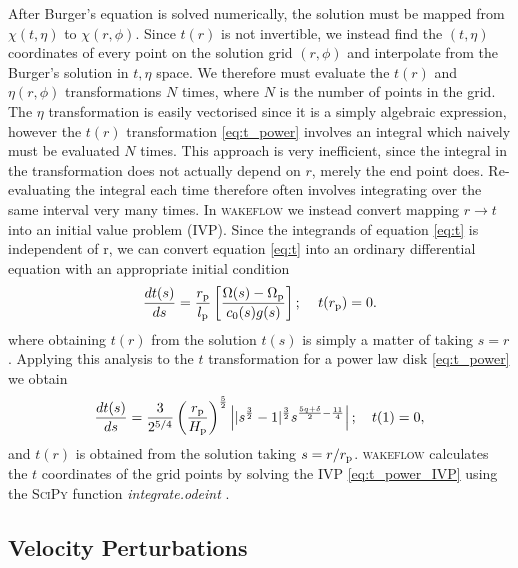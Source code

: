 After Burger's equation is solved numerically, the solution must be mapped from $\chi(t,\eta)$ to $\chi(r,\phi)$.
Since $t(r)$ is not invertible, we instead find the $(t,\eta)$ coordinates of every point on the solution grid $(r,\phi)$ and interpolate from the Burger's solution in $t,\eta$ space.
We therefore must evaluate the $t(r)$ and $\eta(r,\phi)$ transformations $N$ times, where $N$ is the number of points in the grid.
The $\eta$ transformation is easily vectorised since it is a simply algebraic expression, however the $t(r)$ transformation \ref{eq:t_power} involves an integral which naively must be evaluated $N$ times.
This approach is very inefficient, since the integral in the transformation does not actually depend on $r$, merely the end point does.
Re-evaluating the integral each time therefore often involves integrating over the same interval very many times.
In \textsc{wakeflow} we instead convert mapping $r\rightarrow t$ into an initial value problem (IVP).
Since the integrands of equation \ref{eq:t} is independent of r, we can convert equation \ref{eq:t} into an ordinary differential equation with an appropriate initial condition
\begin{align}
    \frac{dt(s)}{ds} = \frac{r_{\rm p}}{l_{\rm p}} \left[ \frac{\Omega(s) - \Omega_{\rm p}}{c_0(s) g(s)} \right]; \quad \, t(r_{\rm p}) = 0.
\end{align}
where obtaining $t(r)$ from the solution $t(s)$ is simply a matter of taking $s=r$.
Applying this analysis to the $t$ transformation for a power law disk \ref{eq:t_power} we obtain 
\begin{align}
    \frac{dt(s)}{ds} = \frac{3}{2^{5/4}} \left( \frac{r_{\rm p}}{H_{\rm p}} \right)^{\frac{5}{2}} \left| |s^\frac{3}{2} - 1|^\frac{3}{2} s^{\frac{5q+\delta}{2}-\frac{11}{4}} \right|; \quad t(1)=0, \label{eq:t_power_IVP}
\end{align}
and $t(r)$ is obtained from the solution taking $s=r/r_{\rm p}$.
\textsc{wakeflow} calculates the $t$ coordinates of the grid points by solving the IVP \ref{eq:t_power_IVP} using the \textsc{SciPy} function \textit{integrate.odeint} \citep{virtanen2020}.

\subsection{Velocity Perturbations} \label{sec:velocity_perts}

